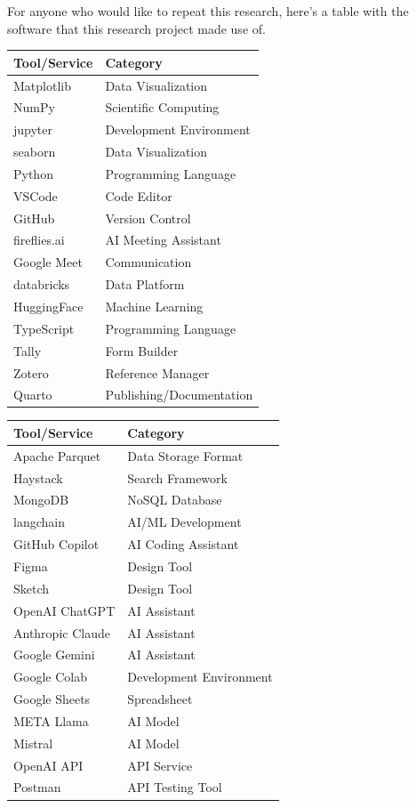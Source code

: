 \documentclass[
  letterpaper,
  DIV=11,
  numbers=noendperiod]{scrartcl}
\begin{document}
For anyone who would like to repeat this research, here's a table with
the software that this research project made use of.

\begin{longtable}[]{@{}ll@{}}
\toprule\noalign{}
Tool/Service & Category \\
\midrule\noalign{}
\endhead
\bottomrule\noalign{}
\endlastfoot
Matplotlib & Data Visualization \\
NumPy & Scientific Computing \\
jupyter & Development Environment \\
seaborn & Data Visualization \\
Python & Programming Language \\
VSCode & Code Editor \\
GitHub & Version Control \\
fireflies.ai & AI Meeting Assistant \\
Google Meet & Communication \\
databricks & Data Platform \\
HuggingFace & Machine Learning \\
TypeScript & Programming Language \\
Tally & Form Builder \\
Zotero & Reference Manager \\
Quarto & Publishing/Documentation \\
\end{longtable}

\begin{longtable}[]{@{}ll@{}}
\toprule\noalign{}
Tool/Service & Category \\
\midrule\noalign{}
\endhead
\bottomrule\noalign{}
\endlastfoot
Apache Parquet & Data Storage Format \\
Haystack & Search Framework \\
MongoDB & NoSQL Database \\
langchain & AI/ML Development \\
GitHub Copilot & AI Coding Assistant \\
Figma & Design Tool \\
Sketch & Design Tool \\
OpenAI ChatGPT & AI Assistant \\
Anthropic Claude & AI Assistant \\
Google Gemini & AI Assistant \\
Google Colab & Development Environment \\
Google Sheets & Spreadsheet \\
META Llama & AI Model \\
Mistral & AI Model \\
OpenAI API & API Service \\
Postman & API Testing Tool \\
\end{longtable}
\end{document}
